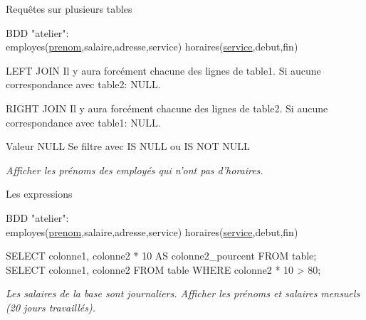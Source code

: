 \documentclass[xetex,dvipsnames]{beamer}
\begin{document}
\begin{frame}[t]{Requêtes sur plusieurs tables}
\begin{small}
		BDD "atelier": \\employes(\underline{prenom},salaire,adresse,service) horaires(\underline{service},debut,fin)
\end{small}	
	\begin{alertblock}{LEFT JOIN}
		Il y aura forcément chacune des lignes de table1. Si aucune correspondance avec table2: NULL.
	\end{alertblock}
	\begin{alertblock}{RIGHT JOIN}
		Il y aura forcément chacune des lignes de table2. Si aucune correspondance avec table1: NULL.
	\end{alertblock}
\begin{footnotesize}
	\begin{block}{Valeur NULL}
		Se filtre avec IS NULL ou IS NOT NULL
	\end{block}
\end{footnotesize}
		
		\textit{Afficher les prénoms des employés qui n'ont pas d'horaires.}\\

\end{frame}

\begin{frame}[t]{Les expressions}
\begin{small}
		BDD "atelier": \\employes(\underline{prenom},salaire,adresse,service) horaires(\underline{service},debut,fin)
\end{small}	
	\begin{alertblock}{}
	SELECT colonne1, colonne2  * 10 AS colonne2\_pourcent FROM table;\\
	SELECT colonne1, colonne2 FROM table WHERE colonne2 * 10 > 80;
	\end{alertblock}

	\textit{Les salaires de la base sont journaliers. Afficher les prénoms et salaires mensuels (20 jours travaillés).}
\end{frame}
\end{document}
